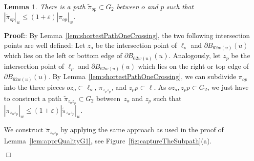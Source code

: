 \documentclass[a4paper,11pt]{article}
\newtheorem{lemma}{Lemma}
\newenvironment{proof}{\textbf{Proof:}}{\hspace*{0mm}\hfill\ensuremath{\Box}}
\begin{document}
\begin{lemma}\label{lem:shortestPathOneCrossingAppr}
	There is a path $\widetilde{\pi}_{op} \subset G_2$ between $o$ and $p$ such that $|\widetilde{\pi}_{op}|_w \leq (1+\varepsilon) |\pi_{op}|_w$.
\end{lemma}
\begin{proof}: By Lemma~\ref{lem:shortestPathOneCrossing}, the two following intersection points are well defined: Let $z_o$ be the intersection point of $\ell_o$ and $\partial B_{62w(u)}(u)$ which lies on the left or bottom edge of $\partial B_{62w(u)}(u)$. Analogously, let $z_p$ be the intersection point of $\ell_p$ and $\partial B_{62w(u)}(u)$ which lies on the right or top edge of $\partial B_{62w(u)}(u)$. By Lemma~\ref{lem:shortestPathOneCrossing}, we can subdivide $\pi_{op}$ into the three pieces $oz_o \subset \ell_o$, $\pi_{z_oz_p}$, and $z_pp \subset \ell$. As $oz_o,z_pp \subset G_2$, we just have to construct a path $\widetilde{\pi}_{z_oz_p} \subset G_2$ between~$z_o$ and $z_p$ such that $|\pi_{z_oz_p}|_w \leq (1 + \varepsilon) |\widetilde{\pi}_{z_oz_p}|_w$.
	
	We construct $\widetilde{\pi}_{z_oz_p}$ by applying the same approach as used in the proof of Lemma~\ref{lem:apprQualityG1}, see Figure~\ref{fig:captureTheSubpath}(a).
	

\end{proof}
\end{document}
